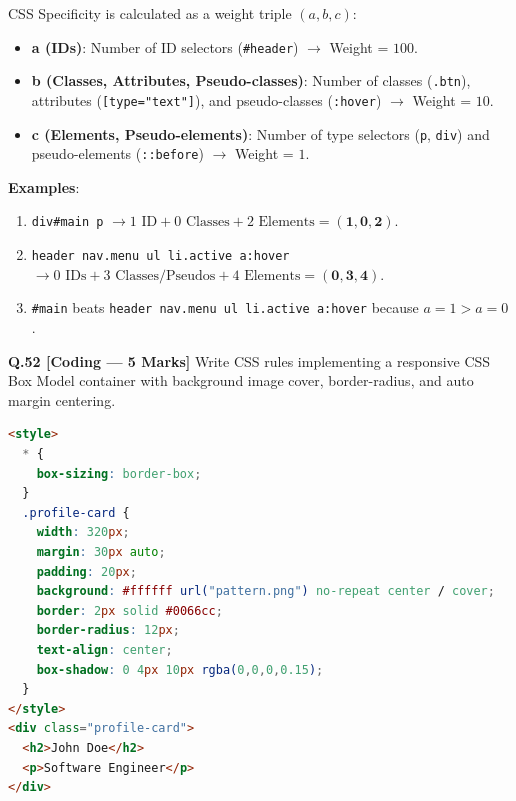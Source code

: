 \begin{qbsolutionbox}[Answer to Q.51]
CSS Specificity is calculated as a weight triple $(a, b, c)$:
\begin{itemize}[leftmargin=*]
  \item \textbf{a (IDs)}: Number of ID selectors (\texttt{\#header}) $\to$ Weight = $100$.
  \item \textbf{b (Classes, Attributes, Pseudo-classes)}: Number of classes (\texttt{.btn}), attributes (\texttt{[type="text"]}), and pseudo-classes (\texttt{:hover}) $\to$ Weight = $10$.
  \item \textbf{c (Elements, Pseudo-elements)}: Number of type selectors (\texttt{p}, \texttt{div}) and pseudo-elements (\texttt{::before}) $\to$ Weight = $1$.
\end{itemize}
\textbf{Examples}:
\begin{enumerate}
  \item \texttt{div\#main p} $\to 1\text{ ID} + 0\text{ Classes} + 2\text{ Elements} = \mathbf{(1, 0, 2)}$.
  \item \texttt{header nav.menu ul li.active a:hover} $\to 0\text{ IDs} + 3\text{ Classes/Pseudos} + 4\text{ Elements} = \mathbf{(0, 3, 4)}$.
  \item \texttt{\#main} beats \texttt{header nav.menu ul li.active a:hover} because $a=1 > a=0$.
\end{enumerate}
\end{qbsolutionbox}

\noindent\textbf{Q.52 [Coding --- 5 Marks]} Write CSS rules implementing a responsive CSS Box Model container with background image cover, border-radius, and auto margin centering.

\begin{qbsolutionbox}[Answer to Q.52]
\begin{lstlisting}[language=HTML]
<style>
  * {
    box-sizing: border-box;
  }
  .profile-card {
    width: 320px;
    margin: 30px auto;
    padding: 20px;
    background: #ffffff url("pattern.png") no-repeat center / cover;
    border: 2px solid #0066cc;
    border-radius: 12px;
    text-align: center;
    box-shadow: 0 4px 10px rgba(0,0,0,0.15);
  }
</style>
<div class="profile-card">
  <h2>John Doe</h2>
  <p>Software Engineer</p>
</div>
\end{lstlisting}
\end{qbsolutionbox}

